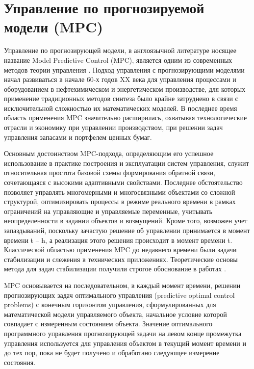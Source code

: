 \section{Управление по прогнозируемой модели (MPC)}\label{1sec:mpc}


Управление по прогнозирующей модели, в англоязычной литературе носящее название Model Predictive Control (MPC), является одним из современных методов теории управления \cite{mpcIn, mpcIn2}. Подход управления с прогнозирующими моделями начал развиваться в начале 60-х годов XX века для управления процессами и оборудованием в нефтехимическом и энергетическом производстве, для которых применение традиционных методов синтеза было крайне затруднено в связи с исключительной сложностью их математических моделей. В последнее время область применения MPC значительно расширилась, охватывая технологические отрасли и экономику при управлении производством, при решении задач управления запасами и портфелем ценных бумаг. 

Основным достоинством MPC-подхода, определяющим его успешное использование в практике построения и эксплуатации систем управления, служит относительная простота базовой схемы формирования обратной связи, сочетающаяся с высокими адаптивными свойствами. Последнее обстоятельство позволяет управлять многомерными и многосвязными объектами со сложной структурой, оптимизировать процессы в режиме реального времени в рамках ограничений на управляющие и управляемые переменные, учитывать неопределенности в задании объектов и возмущений. Кроме того, возможен учет запаздываний, поскольку зачастую решение об управлении принимается в момент времени t – h, а реализация этого решения происходит в момент времени t. Классической областью применения MPC до недавнего времени были задачи стабилизации и слежения в технических приложениях. Теоретические основы метода для задач стабилизации получили строгое обоснование в работах \cite{mpcIn, mpcIn2}.

MPC основывается на последовательном, в каждый момент времени, решении прогнозирующих задач оптимального управления (predictive optimal control problems) с конечным горизонтом управления, сформулированных для математической модели управляемого объекта, начальное условие которой совпадает с измеренным состоянием объекта. Значение оптимального программного управления прогнозирующей задачи на левом конце промежутка управления используется для управления объектом в текущий момент времени и до тех пор, пока не будет получено и обработано следующее измерение состояния.

